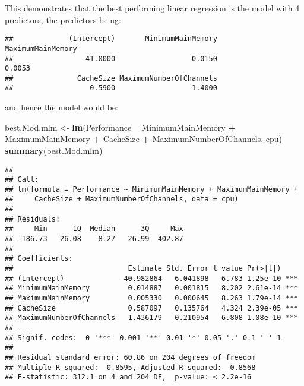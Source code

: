 \documentclass[12pt]{article}
\newenvironment{Shaded}{\begin{snugshade}}{\end{snugshade}}
\newcommand{\DecValTok}[1]{\textcolor[rgb]{0.00,0.00,0.81}{#1}}
\newcommand{\KeywordTok}[1]{\textcolor[rgb]{0.13,0.29,0.53}{\textbf{#1}}}
\newcommand{\NormalTok}[1]{#1}
\newcommand{\OperatorTok}[1]{\textcolor[rgb]{0.81,0.36,0.00}{\textbf{#1}}}
\newcommand{\StringTok}[1]{\textcolor[rgb]{0.31,0.60,0.02}{#1}}
\begin{document}
This demonstrates that the best performing linear regression is the
model with 4 predictors, the predictors being:

\begin{Shaded}
\end{Shaded}

\begin{verbatim}
##             (Intercept)       MinimumMainMemory       MaximumMainMemory 
##                -41.0000                  0.0150                  0.0053 
##               CacheSize MaximumNumberOfChannels 
##                  0.5900                  1.4000
\end{verbatim}

and hence the model would be:

\begin{Shaded}
\begin{Highlighting}[]
\NormalTok{best.Mod.mlm <-}\StringTok{ }\KeywordTok{lm}\NormalTok{(Performance }\OperatorTok{~}\StringTok{ }\NormalTok{MinimumMainMemory }\OperatorTok{+}\StringTok{ }\NormalTok{MaximumMainMemory }\OperatorTok{+}\StringTok{ }\NormalTok{CacheSize }\OperatorTok{+}\StringTok{ }\NormalTok{MaximumNumberOfChannels, cpu)}
\KeywordTok{summary}\NormalTok{(best.Mod.mlm)}
\end{Highlighting}
\end{Shaded}

\begin{verbatim}
## 
## Call:
## lm(formula = Performance ~ MinimumMainMemory + MaximumMainMemory + 
##     CacheSize + MaximumNumberOfChannels, data = cpu)
## 
## Residuals:
##     Min      1Q  Median      3Q     Max 
## -186.73  -26.08    8.27   26.99  402.87 
## 
## Coefficients:
##                           Estimate Std. Error t value Pr(>|t|)    
## (Intercept)             -40.982864   6.041898  -6.783 1.25e-10 ***
## MinimumMainMemory         0.014887   0.001815   8.202 2.61e-14 ***
## MaximumMainMemory         0.005330   0.000645   8.263 1.79e-14 ***
## CacheSize                 0.587097   0.135764   4.324 2.39e-05 ***
## MaximumNumberOfChannels   1.436179   0.210954   6.808 1.08e-10 ***
## ---
## Signif. codes:  0 '***' 0.001 '**' 0.01 '*' 0.05 '.' 0.1 ' ' 1
## 
## Residual standard error: 60.86 on 204 degrees of freedom
## Multiple R-squared:  0.8595, Adjusted R-squared:  0.8568 
## F-statistic: 312.1 on 4 and 204 DF,  p-value: < 2.2e-16
\end{verbatim}
\end{document}
